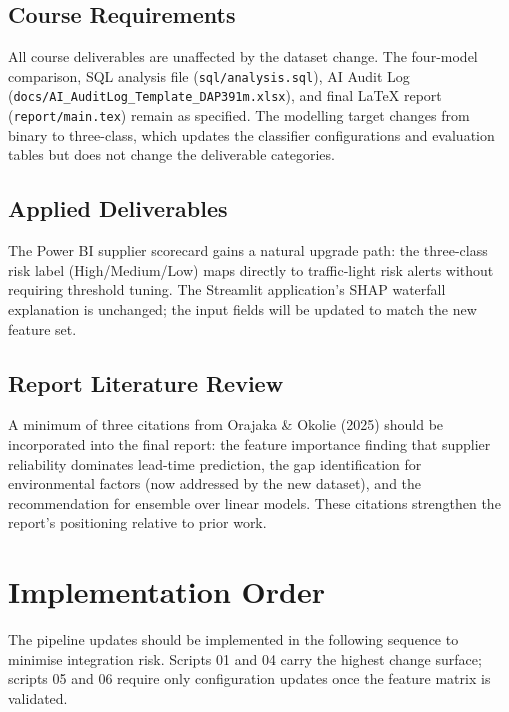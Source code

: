 \documentclass[11pt,a4paper]{article}
\begin{document}
\subsection{Course Requirements}

All course deliverables are unaffected by the dataset change. The four-model
comparison, SQL analysis file (\texttt{sql/analysis.sql}), AI Audit Log
(\texttt{docs/AI\_AuditLog\_Template\_DAP391m.xlsx}), and final LaTeX report
(\texttt{report/main.tex}) remain as specified. The modelling target changes from
binary to three-class, which updates the classifier configurations and evaluation
tables but does not change the deliverable categories.

\subsection{Applied Deliverables}

The Power BI supplier scorecard gains a natural upgrade path: the three-class risk
label (High/Medium/Low) maps directly to traffic-light risk alerts without requiring
threshold tuning. The Streamlit application's SHAP waterfall explanation is unchanged;
the input fields will be updated to match the new feature set.

\subsection{Report Literature Review}

A minimum of three citations from Orajaka \& Okolie (2025) should be incorporated into
the final report: the feature importance finding that supplier reliability dominates
lead-time prediction, the gap identification for environmental factors (now addressed
by the new dataset), and the recommendation for ensemble over linear models. These
citations strengthen the report's positioning relative to prior work.

\section{Implementation Order}

The pipeline updates should be implemented in the following sequence to minimise
integration risk. Scripts 01 and 04 carry the highest change surface; scripts 05 and
06 require only configuration updates once the feature matrix is validated.
\end{document}
